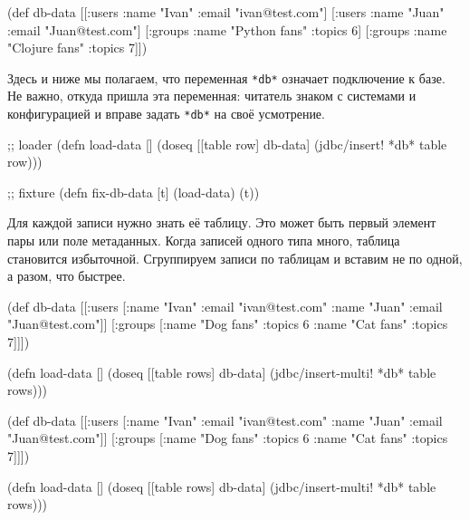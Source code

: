 \else

\begin{english}
  \begin{clojure}
(def db-data
  [[:users {:name "Ivan" :email "ivan@test.com"}]
   [:users {:name "Juan" :email "Juan@test.com"}]
   [:groups {:name "Python fans" :topics 6}]
   [:groups {:name "Clojure fans" :topics 7}]])
  \end{clojure}
\end{english}

\fi


Здесь и ниже мы полагаем, что переменная \verb|*db*| означает подключение к
базе. Не важно, откуда пришла эта переменная: читатель знаком с системами и
конфигурацией и вправе задать \verb|*db*| на своё усмотрение.

\begin{english}
  \begin{clojure}
;; loader
(defn load-data []
  (doseq [[table row] db-data]
    (jdbc/insert! *db* table row)))

;; fixture
(defn fix-db-data [t]
  (load-data)
  (t))
  \end{clojure}
\end{english}

Для каждой записи нужно знать её таблицу. Это может быть первый элемент пары
 или поле метаданных. Когда записей одного типа много,
таблица становится избыточной. Сгруппируем записи по таблицам и вставим не по
одной, а разом, что быстрее.


\ifx\devicetype\mobile

\begin{english}
  \begin{clojure}
(def db-data
  [[:users [{:name "Ivan"
             :email "ivan@test.com"}
            {:name "Juan"
             :email "Juan@test.com"}]]
  [:groups [{:name "Dog fans"
             :topics 6}
            {:name "Cat fans"
             :topics 7}]]])

(defn load-data []
 (doseq [[table rows] db-data]
  (jdbc/insert-multi! *db* table rows)))
  \end{clojure}
\end{english}

\else

\begin{english}
  \begin{clojure}
(def db-data
  [[:users [{:name "Ivan" :email "ivan@test.com"}
            {:name "Juan" :email "Juan@test.com"}]]
   [:groups [{:name "Dog fans" :topics 6}
             {:name "Cat fans" :topics 7}]]])

(defn load-data []
  (doseq [[table rows] db-data]
    (jdbc/insert-multi! *db* table rows)))
  \end{clojure}
\end{english}

